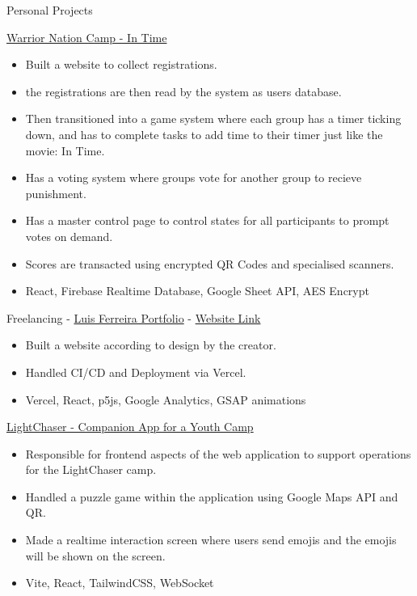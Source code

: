 \documentclass{article}
\newlength{\tabin}
\newlength{\secsep}
\newcommand{\lineunder}{\vspace*{-8pt} \\ \hspace*{-6pt} \hrulefill \\ \vspace*{-15pt}}
\newenvironment{tabbedsection}[1]{
  \begin{list}{}{
      \setlength{\itemsep}{0pt}
      \setlength{\labelsep}{0pt}
      \setlength{\labelwidth}{0pt}
      \setlength{\leftmargin}{\tabin}
      \setlength{\rightmargin}{\tabin}
      \setlength{\listparindent}{0pt}
      \setlength{\parsep}{0pt}
      \setlength{\parskip}{0pt}
      \setlength{\partopsep}{0pt}
      \setlength{\topsep}{#1}
    }
  \item[]
}{\end{list}}
\newenvironment{resume_section}[1]{
  \filbreak
  \vspace{2\secsep}
  \textsc{\large#1}
  \lineunder
  \begin{tabbedsection}{\secsep}
}{\end{tabbedsection}}
\newenvironment{resume_subsection}[2][]{
  \textbf{#2} \hfill {\footnotesize #1} \hspace{2em}
  \begin{tabbedsection}{0.5\secsep}
}{\end{tabbedsection}}
\newenvironment{subitems}{
  \renewcommand{\labelitemi}{-}
  \begin{itemize}
      \setlength{\labelsep}{1em}
}{\end{itemize}}
\begin{document}
\begin{resume_section}{Personal Projects}
  \begin{resume_subsection}[(December 2022)]{\href{https://github.com/etcasual/wncd}{Warrior Nation Camp - In Time}}
    \begin{subitems}
      \item Built a website to collect registrations.
      \item the registrations are then read by the system as users database.
      \item Then transitioned into a game system where each group has a timer ticking down, and has to complete tasks to add time to their timer just like the movie: In Time.
      \item Has a voting system where groups vote for another group to recieve punishment.
      \item Has a master control page to control states for all participants to prompt votes on demand.
      \item Scores are transacted using encrypted QR Codes and specialised scanners.
      \item React, Firebase Realtime Database, Google Sheet API, AES Encrypt
    \end{subitems}
  \end{resume_subsection}

  \vspace{\baselineskip}

  \begin{resume_subsection}[(April 2022)]{Freelancing - {\href{https://github.com/LFBFerreira/portfolio_website}{Luis Ferreira Portfolio} - {\href{https://luisferreira.tech}{Website Link}}}}
    \begin{subitems}
      \item Built a website according to design by the creator.
      \item Handled CI/CD and Deployment via Vercel.
      \item Vercel, React, p5js, Google Analytics, GSAP animations
    \end{subitems}
  \end{resume_subsection}

  \vspace{\baselineskip}

  \begin{resume_subsection}[(April 2022)]{\href{https://github.com/marcustut/lightchaser}{LightChaser - Companion App for a Youth Camp}}
    \begin{subitems}
      \item Responsible for frontend aspects of the web application to support operations for the LightChaser camp.
      \item Handled a puzzle game within the application using Google Maps API and QR.
      \item Made a realtime interaction screen where users send emojis and the emojis will be shown on the screen.
      \item Vite, React, TailwindCSS, WebSocket
    \end{subitems}
  \end{resume_subsection}


\end{resume_section}
\end{document}
